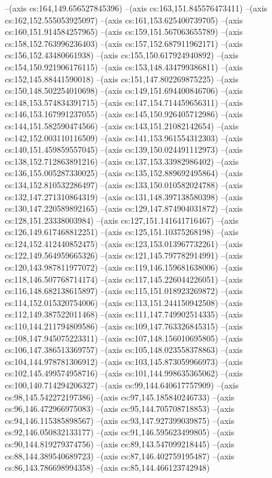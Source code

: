 --(axis cs:164,149.656527845396)
--(axis cs:163,151.845576473411)
--(axis cs:162,152.555053925097)
--(axis cs:161,153.625400739705)
--(axis cs:160,151.914584257965)
--(axis cs:159,151.567063655789)
--(axis cs:158,152.763996236403)
--(axis cs:157,152.687911962171)
--(axis cs:156,152.43480661938)
--(axis cs:155,150.617924940892)
--(axis cs:154,150.921906176115)
--(axis cs:153,148.434799386811)
--(axis cs:152,145.88441590018)
--(axis cs:151,147.802269875225)
--(axis cs:150,148.502254010698)
--(axis cs:149,151.694400846706)
--(axis cs:148,153.574834391715)
--(axis cs:147,154.714459656311)
--(axis cs:146,153.167991237055)
--(axis cs:145,150.926405712986)
--(axis cs:144,151.582590474566)
--(axis cs:143,151.21082142654)
--(axis cs:142,152.003110116509)
--(axis cs:141,153.961554312303)
--(axis cs:140,151.459859557045)
--(axis cs:139,150.024491112973)
--(axis cs:138,152.712863891216)
--(axis cs:137,153.33982986402)
--(axis cs:136,155.005287330025)
--(axis cs:135,152.889692495864)
--(axis cs:134,152.810532286497)
--(axis cs:133,150.010582024788)
--(axis cs:132,147.271310864319)
--(axis cs:131,148.397138580398)
--(axis cs:130,147.220589892165)
--(axis cs:129,147.874904031872)
--(axis cs:128,151.23338003984)
--(axis cs:127,151.141641716467)
--(axis cs:126,149.617468812251)
--(axis cs:125,151.10375268198)
--(axis cs:124,152.412440852475)
--(axis cs:123,153.013967732261)
--(axis cs:122,149.564959665326)
--(axis cs:121,145.797782914991)
--(axis cs:120,143.987811977072)
--(axis cs:119,146.159681638006)
--(axis cs:118,146.507768714174)
--(axis cs:117,145.226044226051)
--(axis cs:116,148.682138615897)
--(axis cs:115,151.018923269872)
--(axis cs:114,152.015320754006)
--(axis cs:113,151.244150942508)
--(axis cs:112,149.387522011468)
--(axis cs:111,147.749902514335)
--(axis cs:110,144.211794809586)
--(axis cs:109,147.763326845315)
--(axis cs:108,147.945075223311)
--(axis cs:107,148.156010695805)
--(axis cs:106,147.386513369757)
--(axis cs:105,148.023558378863)
--(axis cs:104,144.978781306912)
--(axis cs:103,145.873059966973)
--(axis cs:102,145.499574958716)
--(axis cs:101,144.998635365062)
--(axis cs:100,140.714294206327)
--(axis cs:99,144.640617757909)
--(axis cs:98,145.542272197386)
--(axis cs:97,145.185840246733)
--(axis cs:96,146.472966975083)
--(axis cs:95,144.705708718853)
--(axis cs:94,146.115385898567)
--(axis cs:93,147.927399039875)
--(axis cs:92,146.050832133177)
--(axis cs:91,146.595623499805)
--(axis cs:90,144.819279374756)
--(axis cs:89,143.547099218445)
--(axis cs:88,144.389540689723)
--(axis cs:87,146.402759195487)
--(axis cs:86,143.786698994358)
--(axis cs:85,144.466123742948)
